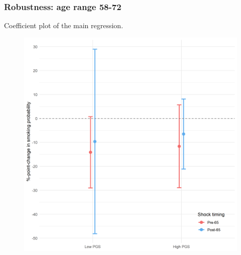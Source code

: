 \documentclass[10pt,compress,xcolor=dvipsnames,aspectratio=169]{beamer}    %
\newcounter{ex}
\newcommand{\1}[1]{\mathrm{1\hspace*{-2.5pt}l}[#1]}	%
\begin{document}
\begin{frame}
\frametitle{Robustness: age range 58-72}
Coefficient plot of the main regression.
\begin{figure}[hbtp]
\centering
\includegraphics[height=0.8\textheight]{../../3_output/shock_effects/robustness_5872_100_cvplot.png}
\label{fig:coeffplot58-72}
\end{figure}
\hyperlink{frame:robustness}{}
\end{frame}
\end{document}
